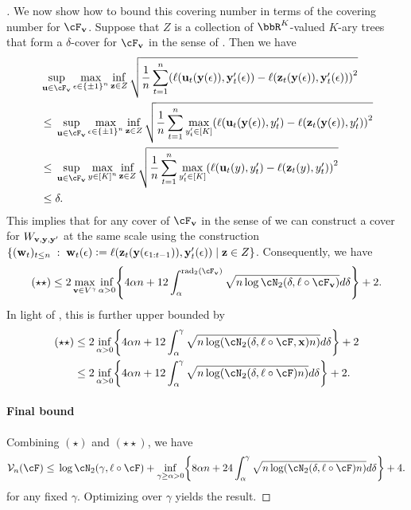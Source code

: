 \begin{proof}[]
 We now show how to bound this covering number in terms of the covering number for $\cF_{\vv}$. Suppose that $Z$ is a collection of $\bbR^{K}$-valued $K$-ary trees that form a $\delta$-cover for $\cF_{\vv}$ in the sense of . Then we have
 \begin{align*}
   &\sup_{\uu\in\cF_{\vv}}\max_{\eps\in\pmo^{n}}\inf_{\zz\in{}Z}\sqrt{\frac{1}{n}\sum_{t=1}^{n}\prn*{\ls(\uu_t(\y(\eps)),\y'_t(\eps)) - \ls(\zz_{t}(\y(\eps)),\y'_t(\eps))}^{2}} \\
   &\leq{} \sup_{\uu\in\cF_{\vv}}\max_{\eps\in\pmo^{n}}\inf_{\zz\in{}Z}\sqrt{\frac{1}{n}\sum_{t=1}^{n}\max_{y'_{t}\in\brk{K}}\prn*{\ls(\uu_t(\y(\eps)),y'_t) - \ls(\zz_t(\y (\eps)),y'_t)}^{2}} \\
   &\leq{} \sup_{\uu\in\cF_{\vv}}\max_{y\in\brk*{K}^{n}}\inf_{\zz\in{}Z}\sqrt{\frac{1}{n}\sum_{t=1}^{n}\max_{y'_{t}\in\brk{K}}\prn*{\ls(\uu_t(y),y'_t) - \ls(\zz_t(y),y'_t)}^{2}}\\
   &\leq{} \delta.
 \end{align*}
 This implies that for any cover of $\cF_{\vv}$ in the sense of  we can construct a cover for $W_{\vv,\y,\y'}$ at the same scale using the construction $\crl*{(\ww_{t})_{t\leq{}n}\;:\;\ww_{t}(\eps) \ldef \ls(\zz_{t}(\y(\eps_{1:t-1})), \y'_{t}(\eps)) \mid{} \zz\in{}Z}$. Consequently, we have
  \[
    (\star\star) \leq{} 2\max_{\vv\in{}V^{\gamma}}\inf_{\alpha>0}\crl*{
      4\alpha{}n + 12\int_{\alpha}^{\mathrm{rad}_{2}(\cF_{\vv})}\sqrt{n\log\cN_{2}(\delta, \ls\circ\cF_{\vv})}d\delta
    } + 2.
  \]
  In light of , this is further upper bounded by
  \begin{align*}
    (\star\star) &\leq{} 2\inf_{\alpha>0}\crl*{
      4\alpha{}n + 12\int_{\alpha}^{\gamma}\sqrt{n\log\prn*{\cN_{2}(\delta, \ls\circ\cF, \x)n}}d\delta
                   } + 2 \\
    &\leq{} 2\inf_{\alpha>0}\crl*{
      4\alpha{}n + 12\int_{\alpha}^{\gamma}\sqrt{n\log\prn*{\cN_{2}(\delta, \ls\circ\cF)n}}d\delta
    } + 2.    
  \end{align*}

\paragraph{Final bound}
Combining $(\star)$ and $(\star\star)$, we have
\[
  \mathcal{V}_n(\F)
  \leq{} \log\cN_{2}(\gamma, \ls\circ\cF) + \inf_{\gamma\geq{}\alpha>0}\crl*{
      8\alpha{}n + 24\int_{\alpha}^{\gamma}\sqrt{n\log\prn*{\cN_{2}(\delta, \ls\circ\cF)n}}d\delta
    } + 4.
\]
for any fixed $\gamma$. Optimizing over $\gamma$ yields the result.
\end{proof}


